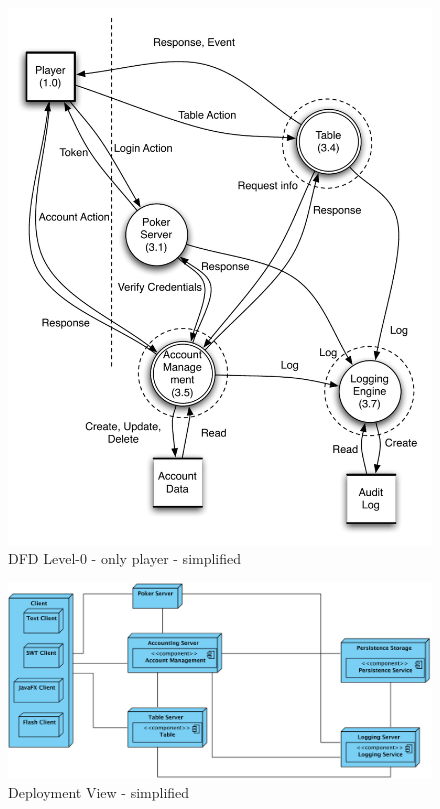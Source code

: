 \documentclass[a4paper,11pt]{report}
\begin{document}
\begin{figure}[htpb]
  \begin{center}
    \includegraphics[scale=0.8]{dfd_level_0_player_simplified}
  \end{center}
  \caption{DFD Level-0 - only player - simplified}\label{fig:dfd_level_0_player_simplified}
\end{figure}
\begin{figure}[htpb]
  \begin{center}
    \includegraphics[angle=90,scale=0.65]{deployment_simplified.png}
  \end{center}
  \caption{Deployment View - simplified}\label{fig: deployment_simplified}
\end{figure}
\end{document}
